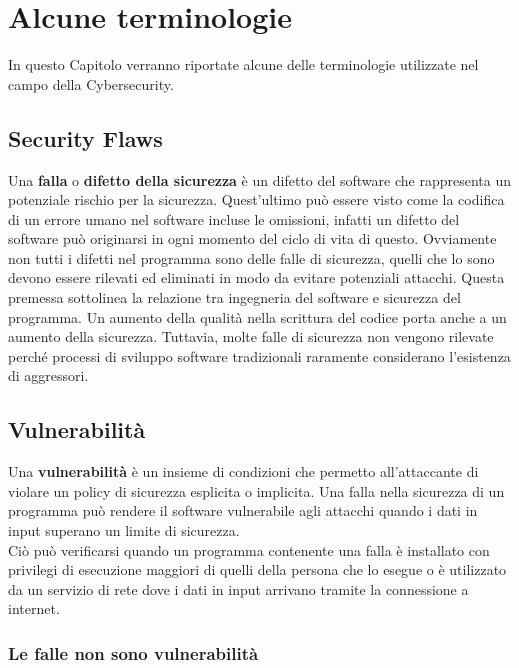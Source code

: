 \chapter{Alcune terminologie}
\label{ch:terminologie}

In questo Capitolo verranno riportate alcune delle terminologie utilizzate nel campo
della Cybersecurity.

\section{Security Flaws}

Una \textbf{falla} o \textbf{difetto della sicurezza} è un difetto del software che
rappresenta un potenziale rischio per la sicurezza.
Quest'ultimo può essere visto come la codifica di un errore umano nel software
incluse le omissioni, infatti un difetto del software può originarsi in ogni momento
del ciclo di vita di questo. Ovviamente non tutti i difetti nel programma sono delle
falle di sicurezza, quelli che lo sono devono essere rilevati ed eliminati in modo
da evitare potenziali attacchi. Questa premessa sottolinea la relazione tra
ingegneria del software e sicurezza del programma. Un aumento della qualità nella
scrittura del codice porta anche a un aumento della sicurezza. Tuttavia, molte falle
di sicurezza non vengono rilevate perché processi di sviluppo software tradizionali
raramente considerano l'esistenza di aggressori.

\section{Vulnerabilità}

Una \textbf{vulnerabilità} è un insieme di condizioni che permetto all'attaccante di
violare un policy di sicurezza esplicita o implicita. Una falla nella sicurezza di un
programma può rendere il software vulnerabile agli attacchi quando i dati in input
superano un limite di sicurezza.\\
Ciò può verificarsi quando un programma contenente una falla è installato con
privilegi di esecuzione maggiori di quelli della persona che lo esegue o è utilizzato
da un servizio di rete dove i dati in input arrivano tramite la connessione a internet.

\subsection{Le falle non sono vulnerabilità}

